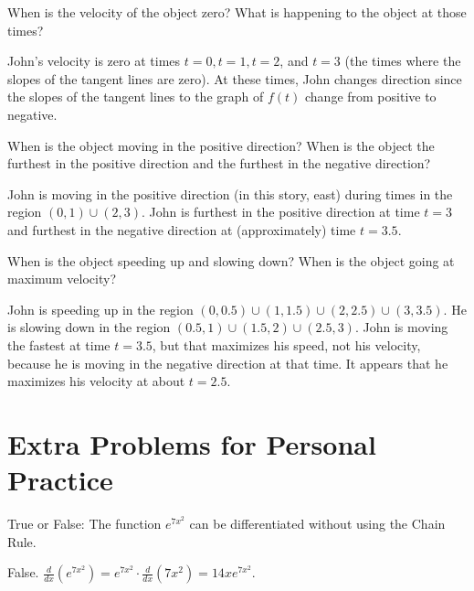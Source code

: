 \documentclass[handout,nooutcomes]{ximera}
\renewenvironment{freeResponse}{
\ifhandout\setbox0\vbox\bgroup\else
\begin{trivlist}\item[\hskip \labelsep\bfseries Solution:\hspace{2ex}]
\fi}
{\ifhandout\egroup\else
\end{trivlist}
\fi}
\newcommand{\ddx}{\frac{d}{dx}}
\begin{document}
\begin{problem}
\begin{enumerate}
\begin{freeResponse}
		\end{freeResponse}
		
	\item  When is the velocity of the object zero?  What is happening to the object at those times? 
		\begin{freeResponse}
		John's velocity is zero at times $t=0,t=1,t=2$, and $t=3$ (the times where the slopes of the tangent lines are zero).  At these times, John changes direction since the slopes of the tangent lines to the graph of $f(t)$ change from positive to negative.
		\end{freeResponse}
		
	\item  When is the object moving in the positive direction?  When is the object the furthest in the positive direction and the furthest in the negative direction?
		\begin{freeResponse}
		John is moving in the positive direction (in this story, east) during times in the region $(0,1) \cup (2,3)$.  John is furthest in the positive direction at time $t=3$ and furthest in the negative direction at (approximately) time $t=3.5$.
		\end{freeResponse}
		
	\item  When is the object speeding up and slowing down? When is the object going at maximum velocity?
		\begin{freeResponse}
		John is speeding up in the region $(0,0.5) \cup (1, 1.5) \cup (2, 2.5) \cup (3, 3.5)$.  He is slowing down in the region $(0.5, 1) \cup (1.5, 2) \cup (2.5, 3)$.  John is moving the fastest at time $t = 3.5$, but that maximizes his speed, not his velocity, because he is moving in the negative direction at that time.  It appears that he maximizes his velocity at about $t=2.5$.  
		\end{freeResponse}
	\end{enumerate}
\end{problem}



\section{Extra Problems for Personal Practice}
          \begin{problem}
            True or False: The function $e^{7x^2}$ can be differentiated without
            using the Chain Rule.
            \begin{freeResponse}
              False.
              $\ddx \left( e^{7x^2} \right) = e^{7x^2} \cdot \ddx
              \left( 7x^2 \right) = 14x e^{7x^2}$.
            \end{freeResponse}
          \end{problem}
\end{document}
